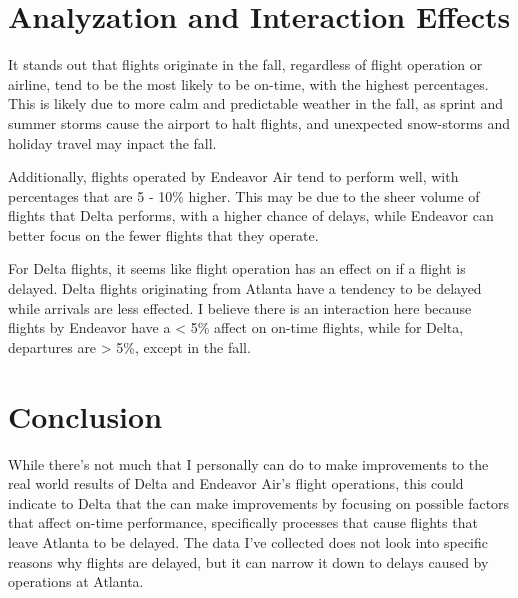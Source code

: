 \documentclass{article}
\begin{document}
  \section{Analyzation and Interaction Effects}

  It stands out that flights originate in the fall, regardless of flight
  operation or airline, tend to be the most likely to be on-time, with the
  highest percentages. This is likely due to more calm and predictable weather
  in the fall, as sprint and summer storms cause the airport to halt flights,
  and unexpected snow-storms and holiday travel may inpact the fall.
  
  Additionally, flights operated by Endeavor Air tend to perform well, with 
  percentages that are 5 - 10\% higher. This may be due to the sheer volume of
  flights that Delta performs, with a higher chance of delays, while Endeavor
  can better focus on the fewer flights that they operate.

  For Delta flights, it seems like flight operation has an effect on if a 
  flight is delayed. Delta flights originating from Atlanta have a tendency to
  be delayed while arrivals are less effected. I believe there is an 
  interaction here because flights by Endeavor have a < 5\% affect on 
  on-time flights, while for Delta, departures are > 5\%, except in the fall.

  \section{Conclusion}

  While there's not much that I personally can do to make improvements to the
  real world results of Delta and Endeavor Air's flight operations, this could
  indicate to Delta that the can make improvements by focusing on possible
  factors that affect on-time performance, specifically processes that cause
  flights that leave Atlanta to be delayed. The data I've collected does not
  look into specific reasons why flights are delayed, but it can narrow it down
  to delays caused by operations at Atlanta.
\end{document}
